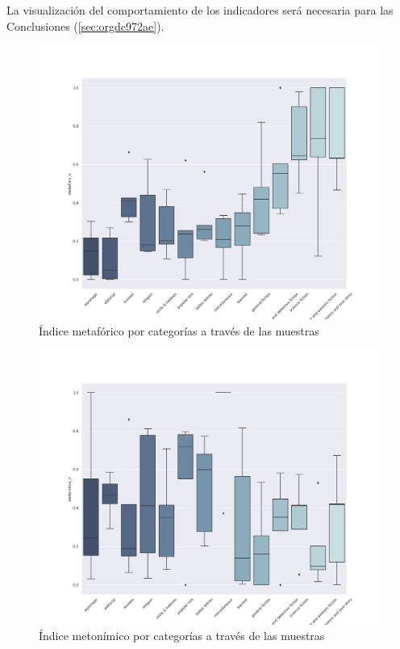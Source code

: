 \documentclass[12pt,letterpaper,twoside]{article}
\begin{document}
La visualización del comportamiento de los indicadores será necesaria para las Conclusiones (\ref{sec:orgdc972ae}).

\begin{figure}[H]
\centering
\includegraphics[width=0.9\linewidth]{./resultados/graphs/total/accum_cat_metafora.png}
\caption{\label{fig:metafora_categorias} Índice metafórico por categorías a través de las muestras }
\end{figure}
\begin{figure}[H]
\centering
\includegraphics[width=0.9\linewidth]{./resultados/graphs/total/accum_cat_metonimia.png}
\caption{\label{fig:metonimia_categorias} Índice metonímico por categorías a través de las muestras  }
\end{figure}
\end{document}

